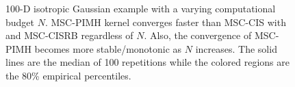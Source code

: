 
\begin{figure}
  \centering
  \caption{100-D isotropic Gaussian example with a varying computational budget \(N\).
    MSC-PIMH kernel converges faster than MSC-CIS with and MSC-CISRB regardless of \(N\).
    Also, the convergence of MSC-PIMH becomes more stable/monotonic as \(N\) increases.
    The solid lines are the median of 100 repetitions while the colored regions are the 80\% empirical percentiles.
  }\label{fig:gaussian}
  \vspace{-0.1in}
\end{figure}


